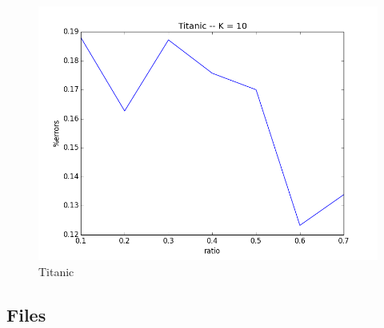 \documentclass[11pt]{article}
\begin{document}
\begin{figure}[htb]
    \center
    \includegraphics[width=0.7\linewidth]{images/tk10_p_bo}
    \caption{Titanic}
    \label{fig:tkp}
\end{figure}

\subsection{Files}
\end{document}
